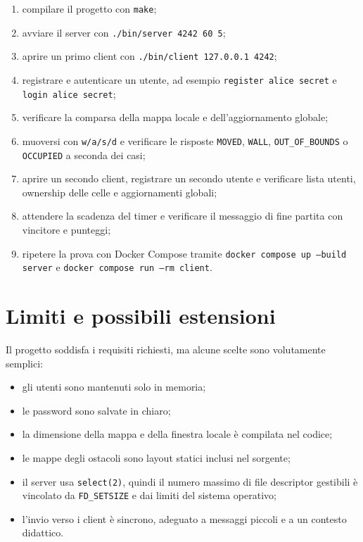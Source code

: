 \documentclass[11pt,a4paper]{article}
\begin{document}
\begin{enumerate}
    \item compilare il progetto con \texttt{make};
    \item avviare il server con \texttt{./bin/server 4242 60 5};
    \item aprire un primo client con \texttt{./bin/client 127.0.0.1 4242};
    \item registrare e autenticare un utente, ad esempio
    \texttt{register alice secret} e \texttt{login alice secret};
    \item verificare la comparsa della mappa locale e dell'aggiornamento
    globale;
    \item muoversi con \texttt{w/a/s/d} e verificare le risposte
    \texttt{MOVED}, \texttt{WALL}, \texttt{OUT\_OF\_BOUNDS} o
    \texttt{OCCUPIED} a seconda dei casi;
    \item aprire un secondo client, registrare un secondo utente e verificare
    lista utenti, ownership delle celle e aggiornamenti globali;
    \item attendere la scadenza del timer e verificare il messaggio di fine
    partita con vincitore e punteggi;
    \item ripetere la prova con Docker Compose tramite
    \texttt{docker compose up --build server} e
    \texttt{docker compose run --rm client}.
\end{enumerate}

\section{Limiti e possibili estensioni}

Il progetto soddisfa i requisiti richiesti, ma alcune scelte sono volutamente
semplici:

\begin{itemize}
    \item gli utenti sono mantenuti solo in memoria;
    \item le password sono salvate in chiaro;
    \item la dimensione della mappa e della finestra locale è compilata nel
    codice;
    \item le mappe degli ostacoli sono layout statici inclusi nel sorgente;
    \item il server usa \texttt{select(2)}, quindi il numero massimo di file
    descriptor gestibili è vincolato da \texttt{FD\_SETSIZE} e dai limiti del
    sistema operativo;
    \item l'invio verso i client è sincrono, adeguato a messaggi piccoli e a un
    contesto didattico.
\end{itemize}
\end{document}

